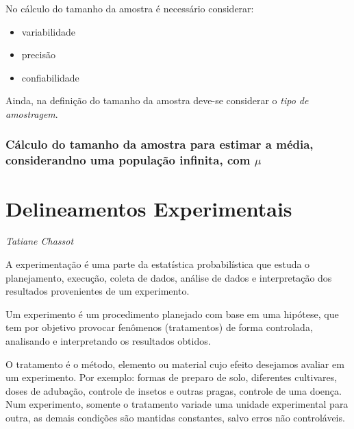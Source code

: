 \documentclass[12pt,brazil,oneside]{book}
\providecommand{\tightlist}{%
  \setlength{\itemsep}{0pt}\setlength{\parskip}{0pt}}
\begin{document}
No cálculo do tamanho da amostra é necessário considerar:

\begin{itemize}
\tightlist
\item
  variabilidade
\item
  precisão
\item
  confiabilidade
\end{itemize}

Ainda, na definição do tamanho da amostra deve-se considerar o \emph{tipo de amostragem}.

\hypertarget{calculo-do-tamanho-da-amostra-para-estimar-a-media-considerandno-uma-populacao-infinita-com-mu}{%
\subsection{\texorpdfstring{Cálculo do tamanho da amostra para estimar a média, considerandno uma população infinita, com \(\mu\)}{Cálculo do tamanho da amostra para estimar a média, considerandno uma população infinita, com \textbackslash{}mu}}\label{calculo-do-tamanho-da-amostra-para-estimar-a-media-considerandno-uma-populacao-infinita-com-mu}}

\hypertarget{delineamentos-experimentais}{%
\chapter{Delineamentos Experimentais}\label{delineamentos-experimentais}}

\emph{Tatiane Chassot}

\begin{flushright}
\emph{}
\end{flushright}

A experimentação é uma parte da estatística probabilística que estuda o planejamento, execução, coleta de dados, análise de dados e interpretação dos resultados provenientes de um experimento.

Um experimento é um procedimento planejado com base em uma hipótese, que tem por objetivo provocar fenômenos (tratamentos) de forma controlada, analisando e interpretando os
resultados obtidos.

O tratamento é o método, elemento ou material cujo efeito desejamos avaliar em um experimento. Por exemplo: formas de preparo de solo, diferentes cultivares, doses de adubação, controle de insetos e outras pragas, controle de uma doença. Num experimento, somente o tratamento variade uma unidade experimental para outra, as demais condições são mantidas constantes, salvo erros não controláveis.
\end{document}
